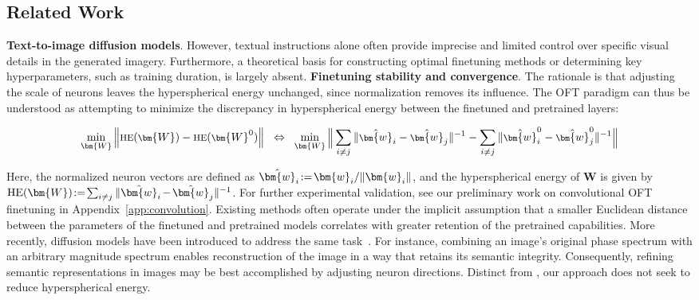 \begin{itemize}[leftmargin=*,nosep]
\section{Related Work}

\textbf{Text-to-image diffusion models}. However, textual instructions alone often provide imprecise and limited control over specific visual details in the generated imagery. Furthermore, a theoretical basis for constructing optimal finetuning methods or determining key hyperparameters, such as training duration, is largely absent. \textbf{Finetuning stability and convergence}. The rationale is that adjusting the scale of neurons leaves the hyperspherical energy unchanged, since normalization removes its influence. The OFT paradigm can thus be understood as attempting to minimize the discrepancy in hyperspherical energy between the finetuned and pretrained layers:

\begin{equation}\label{eq:oft_principle}
\footnotesize
\min_{\bm{W}} \left\| \text{HE}(\bm{W})-\text{HE}(\bm{W}^0)\right\|~~\Leftrightarrow~~\min_{\bm{W}} \bigg{\|} \sum_{i\neq j} \|\hat{\bm{w}}_i-\hat{\bm{w}}_j\|^{-1}-\sum_{i\neq j} \|\hat{\bm{w}}^0_i-\hat{\bm{w}}^0_j\|^{-1}\bigg{\|}
\end{equation}

Here, the normalized neuron vectors are defined as $\thickmuskip=2mu \medmuskip=2mu \hat{\bm{w}}_i:=\bm{w}_i/\|\bm{w}_i\|$, and the hyperspherical energy of $\bm{W}$ is given by $\thickmuskip=2mu \medmuskip=2mu \text{HE}(\bm{W}):= \sum_{i\neq j} \|\hat{\bm{w}}_i-\hat{\bm{w}}_j\|^{-1}$. For further experimental validation, see our preliminary work on convolutional OFT finetuning in Appendix~\ref{app:convolution}. Existing methods often operate under the implicit assumption that a smaller Euclidean distance between the parameters of the finetuned and pretrained models correlates with greater retention of the pretrained capabilities. More recently, diffusion models have been introduced to address the same task~\cite{saharia2022palette,voynov2022sketch,wang2022pretraining}. For instance, combining an image’s original phase spectrum with an arbitrary magnitude spectrum enables reconstruction of the image in a way that retains its semantic integrity. Consequently, refining semantic representations in images may be best accomplished by adjusting neuron directions. Distinct from \cite{liu2021orthogonal}, our approach does not seek to reduce hyperspherical energy. 
\begin{abstract}
Large-scale text-to-image diffusion models have demonstrated remarkable prowess in synthesizing photorealistic images conditioned on textual descriptions. OFT is particularly related to LoRA~\cite{hulora2022}, which updates model weights additively under the assumption of a low-rank structure during finetuning. \subsection{Controllable Generation}


\end{abstract}
\end{itemize}
